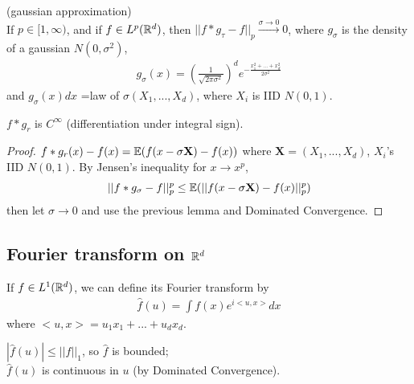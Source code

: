 \documentclass[a4paper]{article}
\begin{document}
\begin{lemma} (gaussian approximation)\\
If $p \in [1,\infty)$, and if $f \in L^p(\mathbb{R}^d)$, then $||f*g_\tau - f||_p \xrightarrow{\sigma \to 0} 0$, where $g_\sigma$ is the density of a gaussian $N(0,\sigma^2)$,
\begin{equation*}
\begin{aligned}
g_\sigma(x) = (\frac{1}{\sqrt{2\pi \sigma^2}})^d e^{-\frac{x_1^2+...+x_d^2}{2\sigma^2}}
\end{aligned}
\end{equation*}
and $g_\sigma(x) dx$ =law of $\sigma(X_1,...,X_d)$, where $X_i$ is IID $N(0,1)$.

\begin{rem}
$f*g_r$ is $C^\infty$ (differentiation under integral sign).
\end{rem}

\begin{proof}
$f*g_r(x) - f(x) = \mathbb{E}(f(x-\sigma\mathbf{X}) - f(x))$ where $\mathbf{X} = (X_1,...,X_d)$, $X_i$'s IID $N(0,1)$. By Jensen's inequality for $x \to x^p$,
\begin{equation*}
\begin{aligned}
||f*g_\sigma-f||_p^p \leq \mathbb{E}(||f(x-\sigma\mathbf{X}) - f(x)||_p^p)
\end{aligned}
\end{equation*}
then let $\sigma \to 0$ and use the previous lemma and Dominated Convergence.
\end{proof}
\end{lemma}

\subsection{Fourier transform on $\mathbb{R}^d$}

\begin{defi}
If $f \in L^1(\mathbb{R}^d)$, we can define its Fourier transform by
\begin{equation*}
\begin{aligned}
\hat{f}(u) = \int f(x) e^{i<u,x>} dx
\end{aligned}
\end{equation*}
where $<u,x> = u_1x_1+...+u_dx_d$.
\end{defi}

\begin{rem}
$|\hat{f}(u)| \leq ||f||_1$, so $\hat{f}$ is bounded;\\
$\hat{f}(u)$ is continuous in $u$ (by Dominated Convergence).
\end{rem}
\end{document}
